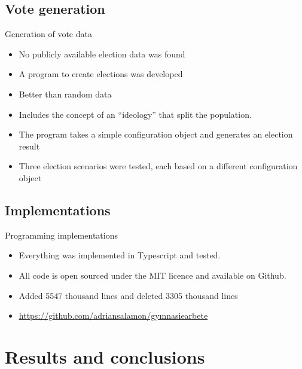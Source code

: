\documentclass[xcolor=table]{beamer}
\begin{document}
\subsection{Vote generation}
\begin{frame}{Generation of vote data}
\begin{itemize}
    \item No publicly available election data was found
    \item A program to create elections was developed
    \item Better than random data
    \item Includes the concept of an ``ideology'' that split the population.
    \item The program takes a simple configuration object and generates an election result
    \item Three election scenarios were tested, each based on a different configuration object
\end{itemize}
    
\end{frame}
\subsection{Implementations}
\begin{frame}{Programming implementations}
\begin{itemize}
    \item Everything was implemented in Typescript and tested.
    \item All code is open sourced under the MIT licence and available on Github.
    \item Added 5547 thousand lines and deleted 3305 thousand lines
    \item \url{https://github.com/adriansalamon/gymnasiearbete}
\end{itemize}
\end{frame}


\section{Results and conclusions}
\end{document}
